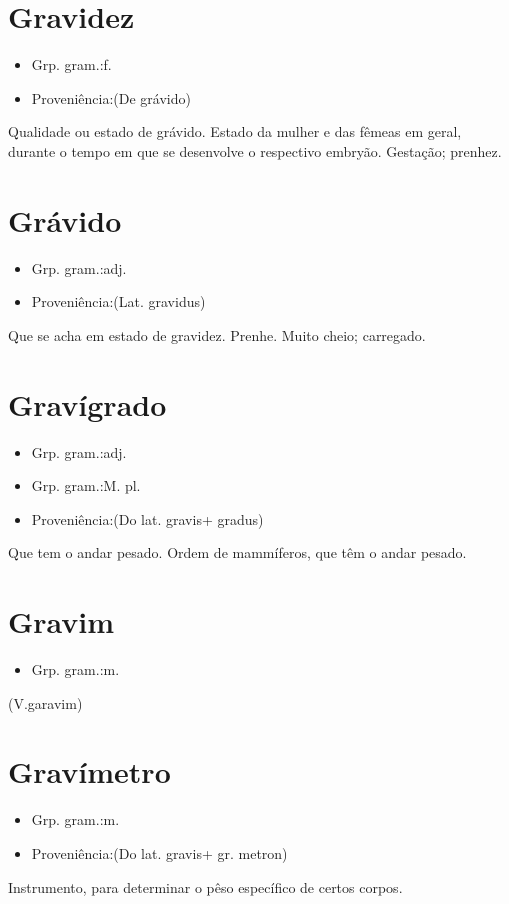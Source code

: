 \section{Gravidez}
\begin{itemize}
\item {Grp. gram.:f.}
\end{itemize}
\begin{itemize}
\item {Proveniência:(De \textunderscore grávido\textunderscore )}
\end{itemize}
Qualidade ou estado de grávido.
Estado da mulher e das fêmeas em geral, durante o tempo em que se desenvolve o respectivo embryão.
Gestação; prenhez.
\section{Grávido}
\begin{itemize}
\item {Grp. gram.:adj.}
\end{itemize}
\begin{itemize}
\item {Proveniência:(Lat. \textunderscore gravidus\textunderscore )}
\end{itemize}
Que se acha em estado de gravidez.
Prenhe.
Muito cheio; carregado.
\section{Gravígrado}
\begin{itemize}
\item {Grp. gram.:adj.}
\end{itemize}
\begin{itemize}
\item {Grp. gram.:M. pl.}
\end{itemize}
\begin{itemize}
\item {Proveniência:(Do lat. \textunderscore gravis\textunderscore  + \textunderscore gradus\textunderscore )}
\end{itemize}
Que tem o andar pesado.
Ordem de mammíferos, que têm o andar pesado.
\section{Gravim}
\begin{itemize}
\item {Grp. gram.:m.}
\end{itemize}
(V.garavim)
\section{Gravímetro}
\begin{itemize}
\item {Grp. gram.:m.}
\end{itemize}
\begin{itemize}
\item {Proveniência:(Do lat. \textunderscore gravis\textunderscore  + gr. \textunderscore metron\textunderscore )}
\end{itemize}
Instrumento, para determinar o pêso específico de certos corpos.
